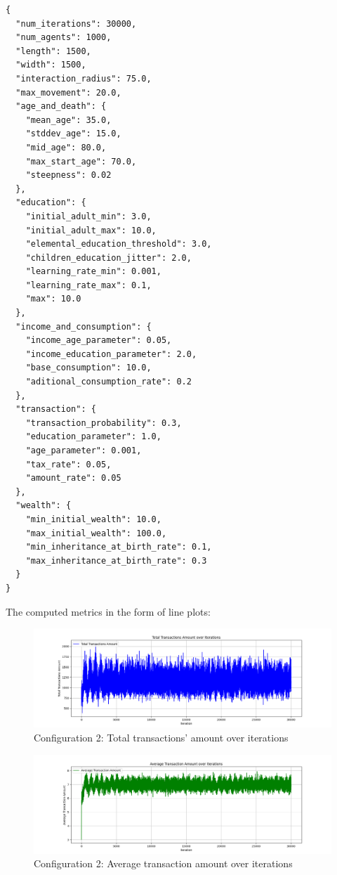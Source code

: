 \documentclass[english]{projectreport}
\begin{document}
    \begin{verbatim}
{
  "num_iterations": 30000,
  "num_agents": 1000,
  "length": 1500,
  "width": 1500,
  "interaction_radius": 75.0,
  "max_movement": 20.0,
  "age_and_death": {
    "mean_age": 35.0,
    "stddev_age": 15.0,
    "mid_age": 80.0,
    "max_start_age": 70.0,
    "steepness": 0.02
  },
  "education": {
    "initial_adult_min": 3.0,
    "initial_adult_max": 10.0,
    "elemental_education_threshold": 3.0,
    "children_education_jitter": 2.0,
    "learning_rate_min": 0.001,
    "learning_rate_max": 0.1,
    "max": 10.0
  },
  "income_and_consumption": {
    "income_age_parameter": 0.05,
    "income_education_parameter": 2.0,
    "base_consumption": 10.0,
    "aditional_consumption_rate": 0.2
  },
  "transaction": {
    "transaction_probability": 0.3,
    "education_parameter": 1.0,
    "age_parameter": 0.001,
    "tax_rate": 0.05,
    "amount_rate": 0.05
  },
  "wealth": {
    "min_initial_wealth": 10.0,
    "max_initial_wealth": 100.0,
    "min_inheritance_at_birth_rate": 0.1,
    "max_inheritance_at_birth_rate": 0.3
  }
}
    \end{verbatim}

    The computed metrics in the form of line plots:

    \begin{figure}[H]
        \centering
        \includegraphics[width=0.8\linewidth]{metrics_config2/metrics_config2_total_transactions_amount.png}
        \caption{Configuration 2: Total transactions' amount over iterations}
        \label{fig:c0-total_transactions_amount}
    \end{figure}

    \begin{figure}[H]
        \centering
        \includegraphics[width=0.8\linewidth]{metrics_config2/metrics_config2_average_transaction_amount.png}
        \caption{Configuration 2: Average transaction amount over iterations}
        \label{fig:c0-average_transaction_amount}
    \end{figure}
\end{document}
